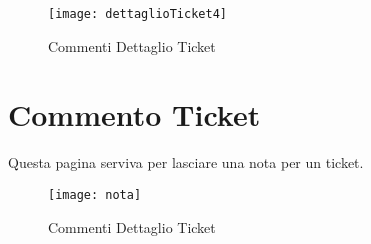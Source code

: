 \begin{figure}[H]
	\centering
    \texttt{[image: dettaglioTicket4]} 
\caption{Commenti Dettaglio Ticket}
\end{figure}
\newpage
\section{Commento Ticket}
Questa pagina serviva per lasciare una nota per un ticket.


\begin{figure}[H]
	\centering
    \texttt{[image: nota]} 
\caption{Commenti Dettaglio Ticket}
\end{figure}
